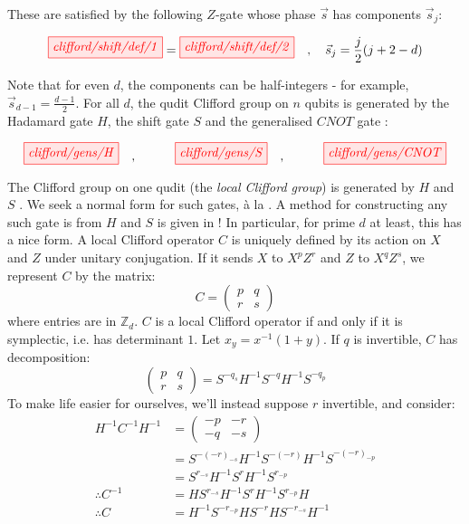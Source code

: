 \documentclass[11pt, oneside]{article}      %
\begin{document}
These are satisfied by the following $Z$-gate whose phase $\vec{s}$ has components $\vec{s}_j$:

\begin{equation}
	\tikzfig{clifford/shift/def/1} = \tikzfig{clifford/shift/def/2} \quad,\quad 
	\vec{s}_j = \frac{j}{2}(j + 2 - d)
\end{equation}

Note that for even $d$, the components can be half-integers - for example, $\vec{s}_{d-1} = \frac{d-1}{2}$. For all $d$, the qudit Clifford group on $n$ qubits is generated by the Hadamard gate $H$, the shift gate $S$ and the generalised $CNOT$ gate \citep{Farinholt_2014}:

\begin{equation}
	\tikzfig{clifford/gens/H} \quad,\hspace{30pt}
	\tikzfig{clifford/gens/S} \quad,\hspace{30pt}
	\tikzfig{clifford/gens/CNOT}
\end{equation}

The Clifford group on one qudit (the \emph{local Clifford group}) is generated by $H$ and $S$ \citep{Farinholt_2014}. We seek a normal form for such gates, \`{a} la \cite[][Theorem 6.2.12]{Wang_2018}. A method for constructing any such gate is from $H$ and $S$ is given in \cite{Farinholt_2014}! In particular, for prime $d$ at least, this has a nice form. A local Clifford operator $C$ is uniquely defined by its action on $X$ and $Z$ under unitary conjugation. If it sends $X$ to $X^pZ^r$ and $Z$ to $X^qZ^s$, we represent $C$ by the matrix:
\begin{equation}
	C = \begin{pmatrix}
		p & q \\
		r & s
	\end{pmatrix} 	
\end{equation}
where entries are in $\mathbb{Z}_d$. $C$ is a local Clifford operator if and only if it is symplectic, i.e. has determinant $1$. Let $x_y = x^{-1}(1+y)$. If $q$ is invertible, $C$ has decomposition:
\begin{equation}
	\begin{pmatrix}
		p & q \\
		r & s
	\end{pmatrix}
	= S^{-q_s}H^{-1}S^{-q}H^{-1}S^{-q_p} 	
\end{equation}
To make life easier for ourselves, we'll instead suppose $r$ invertible, and consider:
\begin{align*}
	H^{-1}C^{-1}H^{-1}
	&= \begin{pmatrix}
		-p & -r \\
		-q & -s
	\end{pmatrix} \\
	&= S^{-(-r)_{-s}}H^{-1}S^{-(-r)}H^{-1}S^{-(-r)_{-p}} \\
	&= S^{r_{-s}}H^{-1}S^{r}H^{-1}S^{r_{-p}} \\
	\therefore C^{-1} &= HS^{r_{-s}}H^{-1}S^{r}H^{-1}S^{r_{-p}}H \\
	\therefore C &= H^{-1}S^{-r_{-p}}HS^{-r}HS^{-r_{-s}}H^{-1}
\end{align*}
\end{document}
